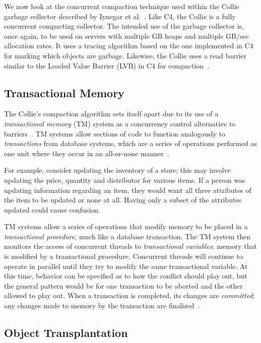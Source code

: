 \documentclass{sig-alternate}
\begin{document}
We now look at the concurrent compaction technique used within the 
Collie garbage collector described by Iynegar et al.~\cite{Iyengar:Collie}. 
Like C4, the Collie is a fully concurrent compacting collector.
The intended use of the garbage collector is, once again, to
be used on servers with multiple GB heaps and multiple GB/sec allocation rates. 
It uses a tracing algorithm based on the one implemented in C4 for 
marking which objects are garbage. Likewise, the Collie uses a read
barrier similar to the Loaded Value Barrier (LVB) in C4 for 
compaction~\cite{Tene:C4}.


\subsection{Transactional Memory}
\label{sec:collieTM}

The Collie's compaction algorithm sets itself apart due to its use 
of a \emph{transactional memory} (TM) system as a concurrency control 
alternative to barriers~\cite{Iyengar:Collie}. TM systems allow
sections of code to function 
analogously to \emph{transactions} from database systems, 
which are a series of operations performed as one unit where 
they occur in an all-or-none manner~\cite{wiki:atomicity}.

For example, consider updating the inventory of a store; this may involve updating
the price, quantity and distributor for various items. 
If a person was updating information regarding an item, they would 
want all three attributes of the item to be updated or none at all. Having
only a subset of the attributes updated could cause confusion.

TM systems allow a series
of operations that modify memory to be placed in
a \emph{transactional procedure}, much like a database transaction.
The TM system then monitors the access of concurrent threads to \emph{transactional variables}:
memory that is modified by a transactional procedure.
Concurrent threads will continue to operate in parallel until they try to modify
the same transactional variable. At this time, behavior can be specified as to how 
the conflict should play out, but the general pattern would be for one transaction
to be aborted and the other allowed to play out.
When a transaction is completed, its changes are \emph{committed}; any changes 
made to memory by the transaction are finalized~\cite{wiki:transactional-memory}.


\subsection{Object Transplantation}
\label{sec:collieTransplantation}
\end{document}
